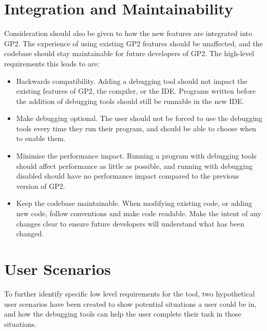 \documentclass[authoryearcitations]{UoYCSproject}
\begin{document}

\section{Integration and Maintainability}
\label{sec:IntegrationAndMaintainability}

Consideration should also be given to how the new features are integrated into
GP2. The experience of using existing GP2 features should be unaffected, and the
codebase should stay maintainable for future developers of GP2. The high-level
requirements this leads to are:

\begin{itemize}
    \item Backwards compatibility. Adding a debugging tool should not impact the
          existing features of GP2, the compiler, or the IDE. Programs written
          before the addition of debugging tools should still be runnable in the
          new IDE.

    \item Make debugging optional. The user should not be forced to use the
          debugging tools every time they run their program, and should be able
          to choose when to enable them.

    \item Minimise the performance impact. Running a program with debugging tools
          should affect performance as little as possible, and running with
          debugging disabled should have no performance impact compared to the
          previous version of GP2.

    \item Keep the codebase maintainable. When modifying existing code, or adding
          new code, follow conventions and make code readable. Make the intent
          of any changes clear to ensure future developers will understand what
          has been changed.
\end{itemize}


\section{User Scenarios}
\label{sec:UserScenarios}

To further identify specific low level requirements for the tool, two
hypothetical user scenarios have been created to show potential situations a
user could be in, and how the debugging tools can help the user complete their
task in those situations.
\end{document}

